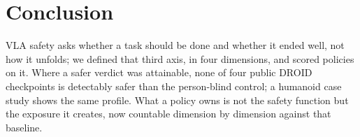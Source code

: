 \section{Conclusion}


VLA safety asks whether a task should be done and whether it ended well, not how it unfolds; we defined that third axis, in four dimensions, and scored policies on it. Where a safer verdict was attainable, none of four public DROID checkpoints is detectably safer than the person-blind control; a humanoid case study shows the same profile. What a policy owns is not the safety function but the exposure it creates, now countable dimension by dimension against that baseline.


